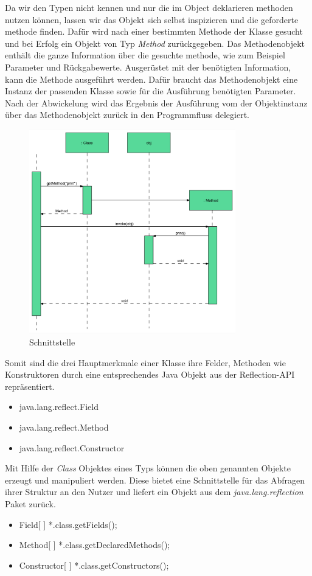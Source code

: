 Da wir den Typen nicht kennen und nur die im Object deklarieren methoden nutzen können, lassen wir das Objekt sich selbst inspizieren und die geforderte methode finden. Dafür wird nach einer bestimmten Methode der Klasse gesucht und bei Erfolg ein Objekt von Typ \textit{Method} zurückgegeben. Das Methodenobjekt enthält die ganze Information über die gesuchte methode, wie zum Beispiel Parameter und Rückgabewerte. Ausgerüstet mit der benötigten Information, kann die Methode ausgeführt werden. Dafür braucht das Methodenobjekt eine Instanz der passenden Klasse sowie für die Ausführung benötigten Parameter. Nach der Abwickelung wird das Ergebnis der Ausführung vom der Objektinstanz über das Methodenobjekt zurück in den Programmfluss delegiert. 
\begin{figure}[h!]
  \centering
  \includegraphics[width=0.8\textwidth]{material/images/reflection-flussdiagram.png}
  \caption{Schnittstelle}
  \label{fig:Schnittstelle}
\end{figure}

\bigbreak
Somit sind die drei Hauptmerkmale einer Klasse ihre Felder, Methoden wie Konstruktoren durch eine entsprechendes Java Objekt aus der Reflection-API repräsentiert. 
\begin{itemize}
  \item java.lang.reflect.Field
  \item java.lang.reflect.Method
  \item java.lang.reflect.Constructor
\end{itemize}
Mit Hilfe der \textit{Class} Objektes eines Typs können die oben genannten Objekte erzeugt und manipuliert werden. Diese bietet eine Schnittstelle für das Abfragen ihrer Struktur an den Nutzer und liefert ein Objekt aus dem \textit{java.lang.reflection} Paket zurück.
\begin{itemize}
  \item Field[ ] *.class.getFields();
  \item Method[ ] *.class.getDeclaredMethods();
  \item Constructor[ ] *.class.getConstructors();
\end{itemize}

